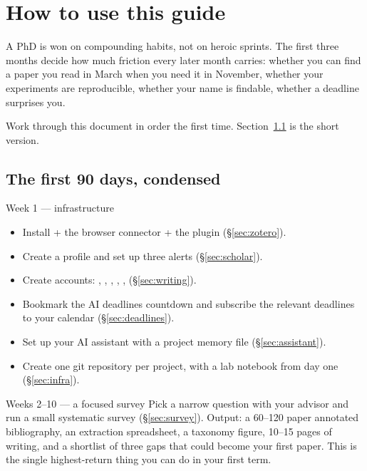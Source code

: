 \documentclass[11pt,a4paper]{article}
\begin{document}
\section{How to use this guide}

A PhD is won on compounding habits, not on heroic sprints. The first three
months decide how much friction every later month carries: whether you can find
a paper you read in March when you need it in November, whether your experiments
are reproducible, whether your name is findable, whether a deadline surprises you.

Work through this document in order the first time. Section~\ref{sec:90days}
is the short version.

\subsection{The first 90 days, condensed}
\label{sec:90days}

\begin{cbox}{Week 1 --- infrastructure}
\begin{itemize}
  \item Install  + the browser connector + the 
        plugin (\S\ref{sec:zotero}).
  \item Create a  profile and set up three alerts
        (\S\ref{sec:scholar}).
  \item Create accounts: , ,
        , , , 
        (\S\ref{sec:writing}).
  \item Bookmark the AI deadlines countdown and subscribe the relevant
        deadlines to your calendar (\S\ref{sec:deadlines}).
  \item Set up your AI assistant with a project memory file
        (\S\ref{sec:assistant}).
  \item Create one git repository per project, with a  lab
        notebook from day one (\S\ref{sec:infra}).
\end{itemize}
\end{cbox}

\begin{cbox}{Weeks 2--10 --- a focused survey}
Pick a narrow question with your advisor and run a small systematic survey
(\S\ref{sec:survey}). Output: a 60--120 paper annotated bibliography, an
extraction spreadsheet, a taxonomy figure, 10--15 pages of writing, and a
shortlist of three gaps that could become your first paper. This is the single
highest-return thing you can do in your first term.
\end{cbox}
\end{document}
